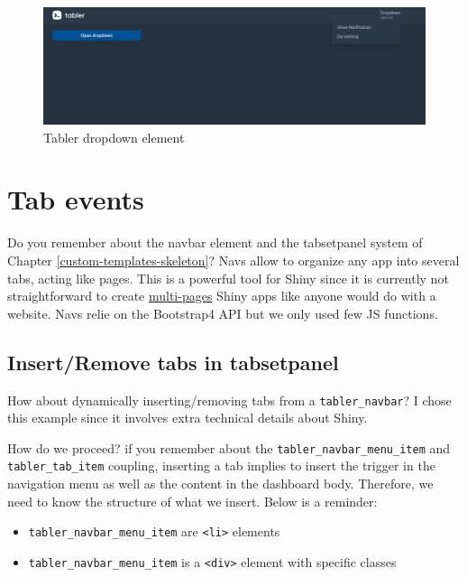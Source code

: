 \documentclass[
]{book}
\providecommand{\tightlist}{%
  \setlength{\itemsep}{0pt}\setlength{\parskip}{0pt}}
\begin{document}
\begin{figure}
\includegraphics[width=14.99in]{images/practice/tabler-dropdown} \caption{Tabler dropdown element}\label{fig:tabler-dropdown}
\end{figure}

\hypertarget{tab-events}{%
\section{Tab events}\label{tab-events}}

Do you remember about the navbar element and the tabsetpanel system of Chapter \ref{custom-templates-skeleton}? Navs allow to organize any app into several tabs, acting like pages. This is a powerful tool for Shiny since it is currently not straightforward to create \href{https://community.rstudio.com/t/shiny-app-composed-of-many-many-pages/7698}{multi-pages} Shiny apps like anyone would do with a website. Navs relie on the Bootstrap4 API but we only used few JS functions.

\hypertarget{insert-tabs}{%
\subsection{Insert/Remove tabs in tabsetpanel}\label{insert-tabs}}

How about dynamically inserting/removing tabs from a \texttt{tabler\_navbar}? I chose this example since it involves extra technical details about Shiny.

How do we proceed? if you remember about the \texttt{tabler\_navbar\_menu\_item} and \texttt{tabler\_tab\_item} coupling, inserting a tab implies to insert the trigger in the navigation menu as well as the content in the dashboard body. Therefore, we need to know the structure of what we insert. Below is a reminder:

\begin{itemize}
\tightlist
\item
  \texttt{tabler\_navbar\_menu\_item} are \texttt{\textless{}li\textgreater{}} elements
\item
  \texttt{tabler\_navbar\_menu\_item} is a \texttt{\textless{}div\textgreater{}} element with specific classes
\end{itemize}
\end{document}
